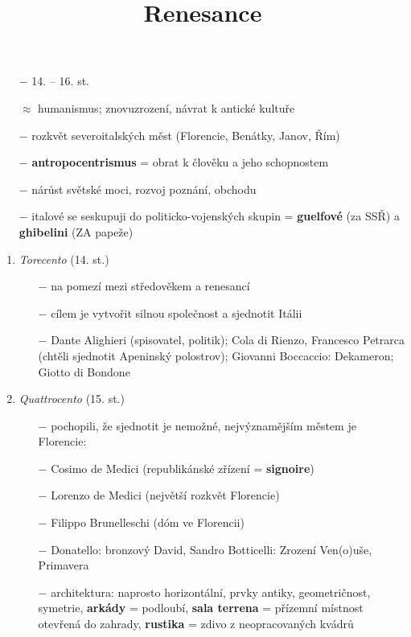 \documentclass{article}
\title{\vspace{-2cm}Renesance\vspace{-1.7cm}}
\date{}
\author{}
\begin{document}
\maketitle

\begin{itemize}
    \vspace{-0.5em}
    \setlength\itemsep{0.15em}
    \item[$-$] 14. – 16. st.
    \item[$\approx$] humanismus; znovuzrození, návrat k antické kultuře
    \item[$-$] rozkvět severoitalských měst (Florencie, Benátky, Janov, Řím)
    \item[$-$] \textbf{antropocentrismus} = obrat k člověku a jeho schopnostem
    \item[$-$] nárůst světské moci, rozvoj poznání, obchodu
    \item[$-$] italové se seskupuji do politicko-vojenských skupin = \textbf{guelfové} (za SSŘ) a \textbf{ghibelini} (ZA papeže)
\end{itemize}

\begin{enumerate}
    \vspace{-0.5em}
    \setlength\itemsep{0.15em}
    \item \textit{Torecento} (14. st.)
        \begin{itemize}
            \vspace{-0.5em}
            \setlength\itemsep{0.15em}
            \item[$-$] na pomezí mezi středověkem a renesancí
            \item[$-$] cílem je vytvořit silnou společnost a sjednotit Itálii
            \item[$-$] Dante Alighieri (spisovatel, politik); Cola di Rienzo, Francesco Petrarca (chtěli sjednotit Apeninský polostrov); Giovanni Boccaccio: Dekameron; Giotto di Bondone
        \end{itemize}
    \item \textit{Quattrocento} (15. st.)
    \begin{itemize}
        \vspace{-0.5em}
        \setlength\itemsep{0.15em}
        \item[$-$] pochopili, že sjednotit je nemožné, nejvýznamějším městem je Florencie:
        \item[$-$] Cosimo de Medici (republikánské zřízení = \textbf{signoire})
        \item[$-$] Lorenzo de Medici (největší rozkvět Florencie)
        \item[$-$] Filippo Brunelleschi (dóm ve Florencii)
        \item[$-$] Donatello: bronzový David, Sandro Botticelli: Zrození Ven(o)uše, Primavera
        \item[$-$] architektura: naprosto horizontální, prvky antiky, geometričnost, symetrie, \textbf{arkády} = podloubí, \textbf{sala terrena} = přízemní místnost otevřená do zahrady, \textbf{rustika} = zdivo z neopracovaných kvádrů

    \end{itemize}
\end{enumerate}
\end{document}
